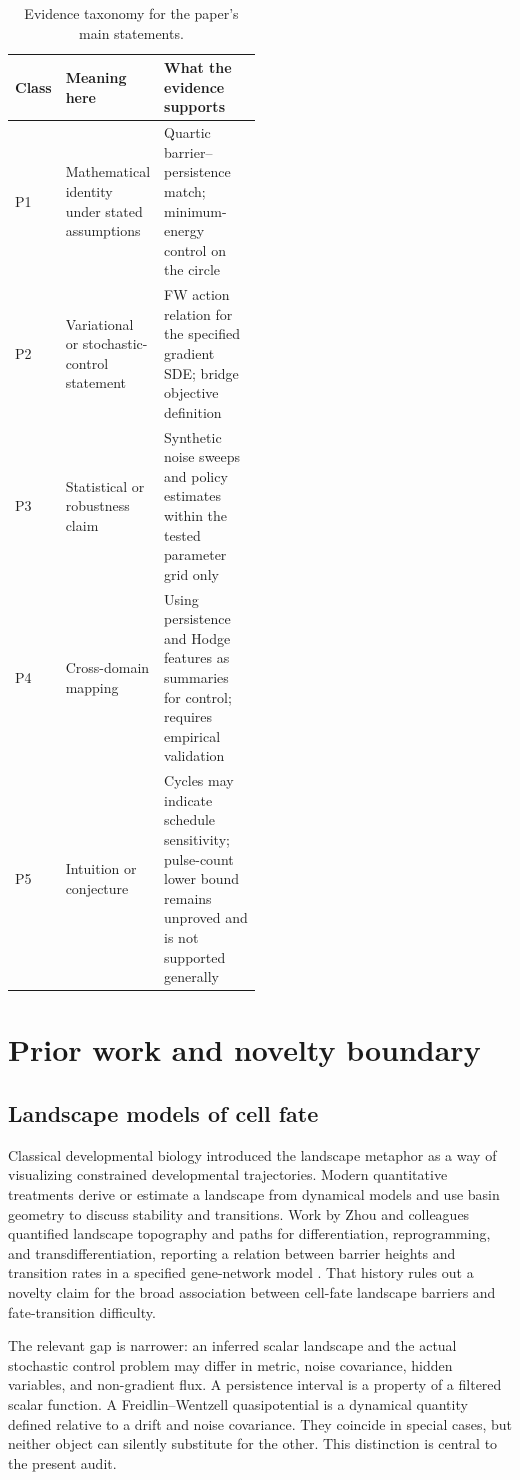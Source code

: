 \documentclass[11pt]{article}
\newcommand{\1}{\mathbf{1}}
\begin{document}
\begin{table}[tbp]\centering\small
\caption{Evidence taxonomy for the paper's main statements.}
\label{tab:epistemic}
\begin{tabularx}{\linewidth}{@{}p{0.13\linewidth}p{0.36\linewidth}X@{}}\toprule
Class & Meaning here & What the evidence supports \\\midrule
P1 & Mathematical identity under stated assumptions & Quartic barrier--persistence match; minimum-energy control on the circle \\
P2 & Variational or stochastic-control statement & FW action relation for the specified gradient SDE; bridge objective definition \\
P3 & Statistical or robustness claim & Synthetic noise sweeps and policy estimates within the tested parameter grid only \\
P4 & Cross-domain mapping & Using persistence and Hodge features as summaries for control; requires empirical validation \\
P5 & Intuition or conjecture & Cycles may indicate schedule sensitivity; pulse-count lower bound remains unproved and is not supported generally \\\bottomrule\end{tabularx}
\end{table}

\section{Prior work and novelty boundary}
\subsection{Landscape models of cell fate}
Classical developmental biology introduced the landscape metaphor as a way of visualizing constrained developmental trajectories. Modern quantitative treatments derive or estimate a landscape from dynamical models and use basin geometry to discuss stability and transitions. Work by Zhou and colleagues quantified landscape topography and paths for differentiation, reprogramming, and transdifferentiation, reporting a relation between barrier heights and transition rates in a specified gene-network model \citep{zhou2013waddington}. That history rules out a novelty claim for the broad association between cell-fate landscape barriers and fate-transition difficulty.

The relevant gap is narrower: an inferred scalar landscape and the actual stochastic control problem may differ in metric, noise covariance, hidden variables, and non-gradient flux. A persistence interval is a property of a filtered scalar function. A Freidlin--Wentzell quasipotential is a dynamical quantity defined relative to a drift and noise covariance. They coincide in special cases, but neither object can silently substitute for the other. This distinction is central to the present audit.
\end{document}
